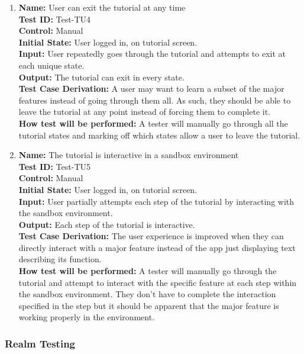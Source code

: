 \documentclass[12pt, titlepage]{article}
\begin{document}
\begin{enumerate}
    \item
    \textbf{Name:} User can exit the tutorial at any time \label{itm:Test-TU4} \\
    \textbf{Test ID:} Test-TU4 \\
    \textbf{Control:} Manual \\
    \textbf{Initial State:} User logged in, on tutorial screen. \\
    \textbf{Input:} User repeatedly goes through the tutorial and attempts to exit at each unique state. \\
    \textbf{Output:} The tutorial can exit in every state. \\
    \textbf{Test Case Derivation:} A user may want to learn a subset of the major features instead of going through them all. As such, they should be able to leave the tutorial at any point instead of forcing them to complete it. \\
    \textbf{How test will be performed:} A tester will manually go through all the tutorial states and marking off which states allow a user to leave the tutorial.
    
    \item
    \textbf{Name:} The tutorial is interactive in a sandbox environment \label{itm:Test-TU5} \\
    \textbf{Test ID:} Test-TU5 \\
    \textbf{Control:} Manual \\
    \textbf{Initial State:} User logged in, on tutorial screen. \\
    \textbf{Input:} User partially attempts each step of the tutorial by interacting with the sandbox environment. \\
    \textbf{Output:} Each step of the tutorial is interactive. \\
    \textbf{Test Case Derivation:} The user experience is improved when they can directly interact with a major feature instead of the app just displaying text describing its function. \\
    \textbf{How test will be performed:} A tester will manually go through the tutorial and attempt to interact with the specific feature at each step within the sandbox environment. They don't have to complete the interaction specified in the step but it should be apparent that the major feature is working properly in the environment.

\end{enumerate}

\subsubsection{Realm Testing}
\end{document}

